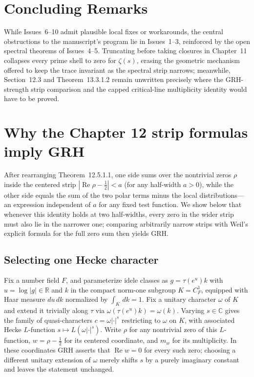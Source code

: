 \documentclass[11pt,letterpaper]{article}
\newcommand{\R}{\mathbb{R}}
\newcommand{\C}{\mathbb{C}}
\newcommand{\dd}{\,d}
\DeclareMathOperator{\RePt}{Re}
\begin{document}
\section{Concluding Remarks}

While Issues~6--10 admit plausible local fixes or workarounds, the central obstructions to the manuscript's program lie in Issues~1--3, reinforced by the open spectral theorems of Issues~4--5. Truncating before taking closures in Chapter~11 collapses every prime shell to zero for $\zeta(s)$, erasing the geometric mechanism offered to keep the trace invariant as the spectral strip narrows; meanwhile, Section~12.3 and Theorem~13.3.1.2 remain unwritten precisely where the GRH-strength strip comparison and the capped critical-line multiplicity identity would have to be proved.

\clearpage
\appendix
\section{Why the Chapter 12 strip formulas imply GRH}
\label{app:strip-grh}

After rearranging Theorem~12.5.1.1, one side sums over the nontrivial zeros $\rho$ inside the centered strip $|\RePt\rho - \tfrac12| < a$ (for any half-width $a>0$), while the other side equals the sum of the two polar terms minus the local distributions---an expression independent of $a$ for any fixed test function. We show below that whenever this identity holds at two half-widths, every zero in the wider strip must also lie in the narrower one; comparing arbitrarily narrow strips with Weil's explicit formula for the full zero sum then yields GRH.

\subsection*{Selecting one Hecke character}

Fix a number field $F$, and parameterize idele classes as $g = \tau(e^u)k$ with $u = \log|g|\in\R$ and $k$ in the compact norm-one subgroup $K = C_F^1$, equipped with Haar measure $du\dd k$ normalized by $\int_K \dd k = 1$. Fix a unitary character $\omega$ of $K$ and extend it trivially along $\tau$ via $\omega(\tau(e^u)k) = \omega(k)$. Varying $s\in\C$ gives the family of quasi-characters $c = \omega|\cdot|^s$ restricting to $\omega$ on $K$, with associated Hecke $L$-function $s \mapsto L(\omega|\cdot|^s)$. Write $\rho$ for any nontrivial zero of this $L$-function, $w = \rho - \tfrac12$ for its centered coordinate, and $m_w$ for its multiplicity. In these coordinates GRH asserts that $\RePt w = 0$ for every such zero; choosing a different unitary extension of $\omega$ merely shifts $s$ by a purely imaginary constant and leaves the statement unchanged.
\end{document}
